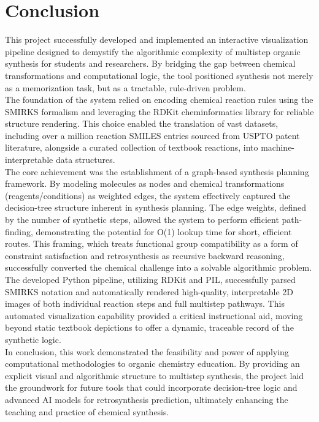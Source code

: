 \documentclass[12pt]{article}
\begin{document}
\section{Conclusion}
\noindent
This project successfully developed and implemented an interactive visualization pipeline designed to demystify the algorithmic complexity of multistep organic synthesis for students and researchers.
By bridging the gap between chemical transformations and computational logic, the tool positioned synthesis not merely as a memorization task, but as a tractable, rule-driven problem.
\\
\indent
The foundation of the system relied on encoding chemical reaction rules using the SMIRKS formalism and leveraging the RDKit cheminformatics library for reliable structure rendering.
This choice enabled the translation of vast datasets, including over a million reaction SMILES entries sourced from USPTO patent literature, alongside a curated collection of textbook reactions, into machine-interpretable data structures.
\\
\indent
The core achievement was the establishment of a graph-based synthesis planning framework.
By modeling molecules as nodes and chemical transformations (reagents/conditions) as weighted edges, the system effectively captured the decision-tree structure inherent in synthesis planning.
The edge weights, defined by the number of synthetic steps, allowed the system to perform efficient path-finding, demonstrating the potential for O(1) lookup time for short, efficient routes.
This framing, which treats functional group compatibility as a form of constraint satisfaction and retrosynthesis as recursive backward reasoning, successfully converted the chemical challenge into a solvable algorithmic problem.
\\
\indent
The developed Python pipeline, utilizing RDKit and PIL, successfully parsed SMIRKS notation and automatically rendered high-quality, interpretable 2D images of both individual reaction steps and full multistep pathways.
This automated visualization capability provided a critical instructional aid, moving beyond static textbook depictions to offer a dynamic, traceable record of the synthetic logic.
\\
\indent
In conclusion, this work demonstrated the feasibility and power of applying computational methodologies to organic chemistry education.
By providing an explicit visual and algorithmic structure to multistep synthesis, the project laid the groundwork for future tools that could incorporate decision-tree logic and advanced AI models for retrosynthesis prediction, ultimately enhancing the teaching and practice of chemical synthesis.


\end{document}
